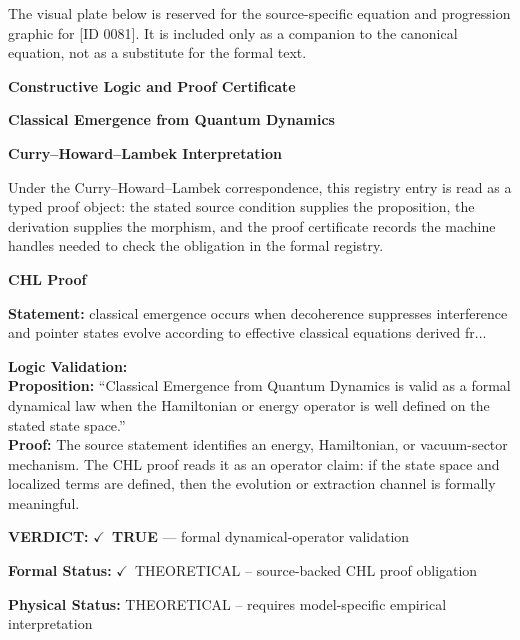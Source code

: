 \begingroup\footnotesize\sloppy
The visual plate below is reserved for the source-specific equation and progression graphic for [ID 0081]. It is included only as a companion to the canonical equation, not as a substitute for the formal text.
\par\endgroup
\ifTZPDarkEdition
{}
\fi

\clearpage
\begingroup\tzpsupportsetup
\noindent\textbf{\fontsize{10.8pt}{12.8pt}\selectfont [ID 0081] Constructive Logic and Proof Certificate}\par
\noindent\textbf{\fontsize{10pt}{12pt}\selectfont Classical Emergence from Quantum Dynamics}\par
\vspace{0.45em}
\begingroup
\footnotesize
\setlength{\parskip}{0.22em}
\setlength{\parindent}{0pt}
\noindent\textbf{Curry--Howard--Lambek Interpretation}\par
Under the Curry--Howard--Lambek correspondence, this registry entry is read as a typed proof
object: the stated source condition supplies the proposition, the derivation supplies the
morphism, and the proof certificate records the machine handles needed to check the obligation
in the formal registry.

\vspace{0.45em}
\noindent\textbf{CHL Proof}\par
\textbf{Statement:} classical emergence occurs when decoherence suppresses interference and pointer states
evolve according to effective classical equations derived fr...

\textbf{Logic Validation:}\\
\textbf{Proposition:} ``Classical Emergence from Quantum Dynamics is valid as a formal dynamical law when the
Hamiltonian or energy operator is well defined on the stated state space.''\\
\textbf{Proof:} The source statement identifies an energy, Hamiltonian, or vacuum-sector mechanism. The
CHL proof reads it as an operator claim: if the state space and localized terms are
defined, then the evolution or extraction channel is formally meaningful.

\textbf{VERDICT:} \ensuremath{\checkmark}\ \textbf{TRUE} --- formal dynamical-operator validation

\textbf{Formal Status:} \ensuremath{\checkmark}\ THEORETICAL -- source-backed CHL proof obligation

\textbf{Physical Status:} THEORETICAL -- requires model-specific empirical interpretation
\par\vspace{0.45em}
\par
\ifTZPDarkEdition
{}
\fi
\endgroup
\endgroup
